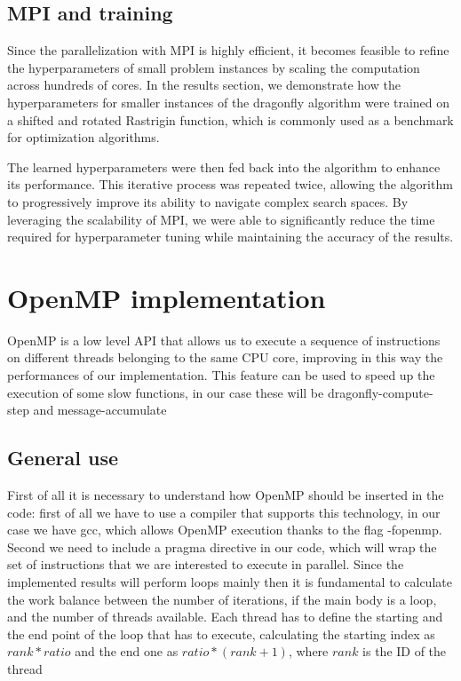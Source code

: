 \documentclass[10pt]{article}
\begin{document}
\begin{multicols}{2}
\subsection*{MPI and training}
Since the parallelization with MPI is highly efficient, it becomes feasible to refine the hyperparameters of small problem instances by scaling the computation across hundreds of cores.
In the results section, we demonstrate how the hyperparameters for smaller instances of the dragonfly algorithm were trained on a shifted and rotated Rastrigin function, which is commonly used as a benchmark for optimization algorithms.

The learned hyperparameters were then fed back into the algorithm to enhance its performance.
This iterative process was repeated twice, allowing the algorithm to progressively improve its ability to navigate complex search spaces.
By leveraging the scalability of MPI, we were able to significantly reduce the time required for hyperparameter tuning while maintaining the accuracy of the results.

\section{OpenMP implementation}

OpenMP is a low level API that allows us to execute a sequence of instructions on different threads belonging
to the same CPU core, improving in this way the performances of our implementation. This feature can be used to 
speed up the execution of some slow functions, in our case these will be dragonfly-compute-step and message-accumulate

\subsection*{General use}

First of all it is necessary to understand how OpenMP should be inserted in the code: first of all we have to use 
a compiler that supports this technology, in our case we have gcc, which allows OpenMP execution thanks to the flag -fopenmp.
Second we need to include a pragma directive in our code, which will wrap the set of instructions that we are interested to execute
in parallel. Since the implemented results will perform loops mainly then it is fundamental to calculate the work balance between the number of iterations, if the main
body is a loop,
and the number of threads available. Each thread has to define the starting and the end point of the loop that has to execute,
calculating the starting index as $rank*ratio$ and the end one as $ratio*(rank+1)$, where $rank$ is the ID of the thread


\end{multicols}
\end{document}
